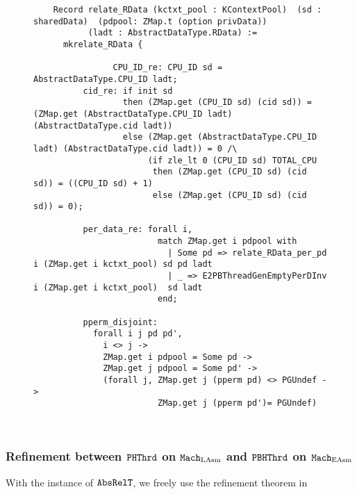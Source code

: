 \begin{figure}
\begin{lstlisting}
    Record relate_RData (kctxt_pool : KContextPool)  (sd : sharedData)  (pdpool: ZMap.t (option privData))
           (ladt : AbstractDataType.RData) :=
      mkrelate_RData {
      
                CPU_ID_re: CPU_ID sd = AbstractDataType.CPU_ID ladt;
          cid_re: if init sd
                  then (ZMap.get (CPU_ID sd) (cid sd)) = (ZMap.get (AbstractDataType.CPU_ID ladt) (AbstractDataType.cid ladt))
                  else (ZMap.get (AbstractDataType.CPU_ID ladt) (AbstractDataType.cid ladt)) = 0 /\
                       (if zle_lt 0 (CPU_ID sd) TOTAL_CPU
                        then (ZMap.get (CPU_ID sd) (cid sd)) = ((CPU_ID sd) + 1)
                        else (ZMap.get (CPU_ID sd) (cid sd)) = 0);

          per_data_re: forall i,
                         match ZMap.get i pdpool with 
                           | Some pd => relate_RData_per_pd i (ZMap.get i kctxt_pool) sd pd ladt
                           | _ => E2PBThreadGenEmptyPerDInv i (ZMap.get i kctxt_pool)  sd ladt
                         end;          

          pperm_disjoint: 
            forall i j pd pd',
              i <> j ->
              ZMap.get i pdpool = Some pd ->
              ZMap.get j pdpool = Some pd' ->
              (forall j, ZMap.get j (pperm pd) <> PGUndef ->
                         ZMap.get j (pperm pd')= PGUndef)
           
           
\end{lstlisting}
\end{figure}

\subsubsection{Refinement between ${\mathrm{\texttt{PHThrd}}}$ on ${\mathrm{\texttt{Mach}}}_{\mathrm{LAsm}}$ and 
 ${\mathrm{\texttt{PBHThrd}}}$ on ${\mathrm{\texttt{Mach}}}_{\mathrm{EAsm}}$}
 
 
With the instance of ${\mathrm{\texttt{AbsRelT}}}$,
we freely use the refinement theorem in 

